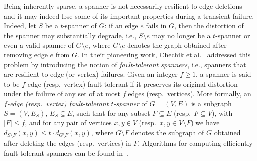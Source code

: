 \documentclass{article}
\begin{document}
Being inherently sparse, a spanner is not necessarily resilient to edge deletions and it may indeed lose some of its important properties during a transient failure. Indeed, let $S$ be a $t$-spanner of $G$:
if an edge $e$  fails in $G$, then 
the distortion of the spanner may substantially degrade, i.e., 
$S\setminus e$ may no longer be a $t$-spanner or even a valid spanner of $G\setminus e$, 
where $G \setminus e$ denotes the graph obtained after removing edge $e$ from $G$. 
In their pioneering work, Chechik et al.~\cite{STOC09} addressed this problem by introducing the notion of \emph{fault-tolerant spanners}, i.e., spanners that are resilient to edge (or vertex) failures.
Given an integer $f\geq 1$, a spanner is said to be $f$-edge (resp.~vertex) fault-tolerant if it preserves its original distortion under the failure of any set of at most $f$ edges (resp.~vertices). More formally, an \emph{$f$-edge (resp.~vertex) fault-tolerant $t$-spanner} of  $G=(V,E)$ is a subgraph $S=(V,E_S)$, $E_S\subseteq E$, such that for any subset $F \subseteq E$ (resp.~$F \subseteq V$), with $|F| \leq f$, and  for any pair of vertices $x,y \in V$ (resp.~$x,y \in V \setminus F$)  we have $d_{S \setminus F}(x,y) \leq t \cdot d_{G \setminus F}(x,y)$,
where $G \setminus F$ denotes the subgraph of $G$ obtained after deleting the edges (resp.~vertices) in $F$. Algorithms for computing efficiently fault-tolerant spanners can be found in~\cite{dmaa,ChechickAdditive,STOC09,Dinitz}.
\end{document}
